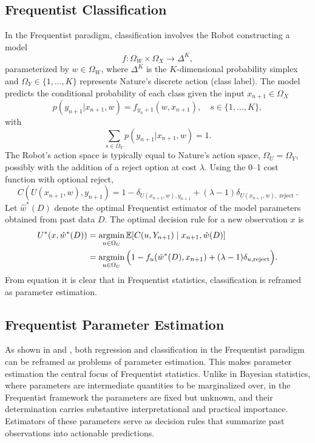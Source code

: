 \subsection{Frequentist Classification}
\label{chp:frequentist_classification}
In the Frequentist paradigm, classification involves the Robot constructing a model
\begin{equation}
	f: \Omega_W \times \Omega_X \to \Delta^K,
\end{equation}
parameterized by $w \in \Omega_W$, where $\Delta^K$ is the $K$-dimensional probability simplex and $\Omega_Y \in \{1,\dots,K\}$ represents Nature's discrete action (class label). The model predicts the conditional probability of each class given the input $x_{n+1} \in \Omega_X$
\begin{equation}
	p(y_{n+1} | x_{n+1}, w) = f_{y_n+1}(w, x_{n+1}), \quad s \in \{1,\dots,K\},
\end{equation}
with
\begin{equation}
	\sum_{s\in \Omega_Y} p(y_{n+1} | x_{n+1}, w) = 1.
\end{equation}
The Robot's action space is typically equal to Nature's action space, $\Omega_U = \Omega_Y$, possibly with the addition of a reject option at cost $\lambda$. Using the 0--1 cost function with optional reject,
\begin{equation}
	C(U(x_{n+1},w), y_{n+1}) = 1 - \delta_{U(x_{n+1},w),y_{n+1}} + (\lambda-1)\delta_{U(x_{n+1},w), \operatorname{reject}}.
\end{equation}
Let $\hat{w}^*(D)$ denote the optimal Frequentist estimator of the model parameters obtained from past data $D$. The optimal decision rule for a new observation $x$ is
\begin{equation}
	\begin{split}
		U^*(x, \hat{w}^*(D)) &= \operatorname*{argmin}_{u \in \Omega_U} \mathbb{E}[C(u, Y_{n+1}) \mid x_{n+1}, \hat{w}(D)] \\
		&= \operatorname*{argmin}_{u \in \Omega_U} \Big(1 - f_{u}(\hat{w}^*(D), x_{n+1}) + (\lambda-1)\delta_{u, \operatorname{reject}}\Big).
	\end{split}
	\label{freq:decision_classification}
\end{equation}
From equation  it is clear that in Frequentist statistics, classification is reframed as parameter estimation.


\subsection{Frequentist Parameter Estimation}
\label{chp:frequentist_parameter_estimation}
As shown in  and , both regression and classification in the Frequentist paradigm can be reframed as problems of parameter estimation. This makes parameter estimation the central focus of Frequentist statistics. Unlike in Bayesian statistics, where parameters are intermediate quantities to be marginalized over, in the Frequentist framework the parameters are fixed but unknown, and their determination carries substantive interpretational and practical importance. Estimators of these parameters serve as decision rules that summarize past observations into actionable predictions.

